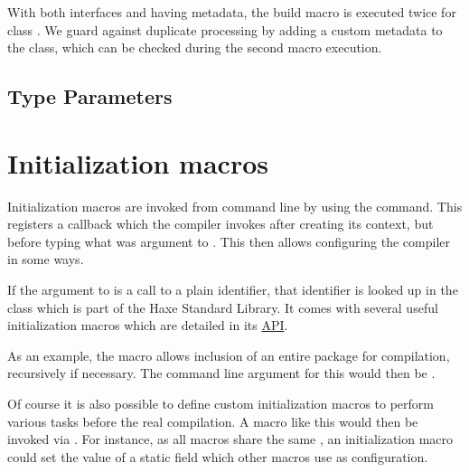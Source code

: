 
With both interfaces  and  having  metadata, the build macro is executed twice for class . We guard against duplicate processing by adding a custom  metadata to the class, which can be checked during the second macro execution.


\subsection{Type Parameters}
\label{macro-limitations-type-parameters}


\section{Initialization macros}
\label{macro-initialization}

Initialization macros are invoked from command line by using the  command. This registers a callback which the compiler invokes after creating its context, but before typing what was argument to . This then allows configuring the compiler in some ways.

If the argument to  is a call to a plain identifier, that identifier is looked up in the class  which is part of the Haxe Standard Library. It comes with several useful initialization macros which are detailed in its \href{http://api.haxe.org//haxe/macro/Compiler.html}{API}.

As an example, the  macro allows inclusion of an entire package for compilation, recursively if necessary. The command line argument for this would then be .

Of course it is also possible to define custom initialization macros to perform various tasks before the real compilation. A macro like this would then be invoked via . For instance, as all macros share the same , an initialization macro could set the value of a static field which other macros use as configuration.

